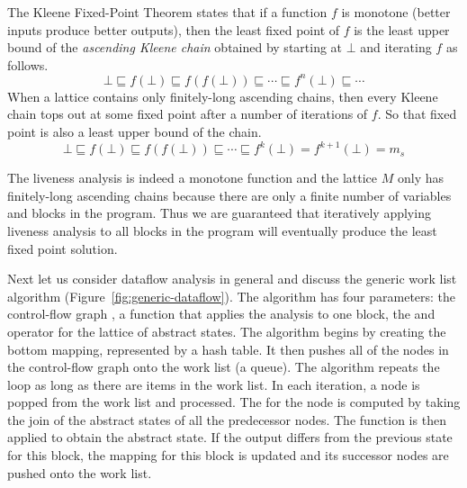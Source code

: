 \documentclass[11pt]{book}
\newcommand{\ocaml}[1]{{\color{blue}{#1}}}
\begin{document}
The Kleene Fixed-Point Theorem states that if a function $f$ is
monotone (better inputs produce better outputs), then the least fixed
point of $f$ is the least upper bound of the \emph{ascending Kleene
  chain} obtained by starting at $\bot$ and iterating $f$ as
follows.
\[
\bot \sqsubseteq f(\bot) \sqsubseteq f(f(\bot)) \sqsubseteq \cdots
  \sqsubseteq f^n(\bot) \sqsubseteq \cdots
\]
When a lattice contains only finitely-long ascending chains, then
every Kleene chain tops out at some fixed point after a number of
iterations of $f$. So that fixed point is also a least upper
bound of the chain.
\[
\bot \sqsubseteq f(\bot) \sqsubseteq f(f(\bot)) \sqsubseteq \cdots
\sqsubseteq f^k(\bot) = f^{k+1}(\bot) = m_s
\]

The liveness analysis is indeed a monotone function and the lattice
$M$ only has finitely-long ascending chains because there are only a
finite number of variables and blocks in the program. Thus we are
guaranteed that iteratively applying liveness analysis to all blocks
in the program will eventually produce the least fixed point solution.

Next let us consider dataflow analysis in general and discuss the
generic work list algorithm (Figure~\ref{fig:generic-dataflow}).
%
The algorithm has four parameters: the control-flow graph , a
function  that applies the analysis to one block, the
 and  operator for the lattice of abstract
states.  The algorithm begins by creating the bottom mapping,
represented by a hash table.  It then pushes all of the nodes in the
control-flow graph onto the work list (a queue).
\ocaml{(The order in which this is done does not matter for correctness,
  but can have a major effect on efficiency; see below.)}
The algorithm repeats
the  loop as long as there are items in the work list. In
each iteration, a node is popped from the work list and processed. The
 for the node is computed by taking the join of the
abstract states of all the predecessor nodes. The 
function is then applied to obtain the  abstract
state. If the output differs from the previous state for this block,
the mapping for this block is updated and its successor nodes are
pushed onto the work list. 
\end{document}
